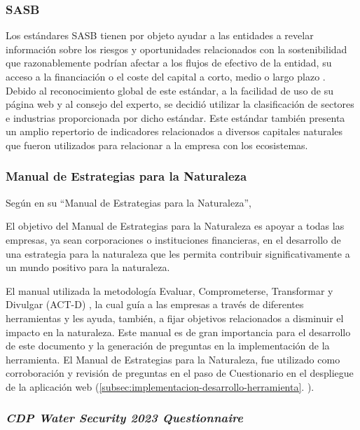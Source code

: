 \subsubsection{SASB}
Los estándares SASB tienen por objeto ayudar a las entidades a revelar información sobre los riesgos y oportunidades relacionados con la sostenibilidad que razonablemente podrían afectar a los flujos de efectivo de la entidad, su acceso a la financiación o el coste del capital a corto, medio o largo plazo \parencite{sasb-standards-2023}. Debido al reconocimiento global de este estándar, a la facilidad de uso de su página web y al consejo del experto, se decidió utilizar la clasificación de sectores e industrias proporcionada por dicho estándar. Este estándar también presenta un amplio repertorio de indicadores relacionados a diversos capitales naturales que fueron utilizados para relacionar a la empresa con los ecosistemas.  


\subsubsection{Manual de Estrategias para la Naturaleza}
Según \textcite{its-now-for-nature-2023} en su  “Manual de Estrategias para la Naturaleza”,

\hfill
\par
\leftskip=0.35in \rightskip=0.35in
El objetivo del Manual de Estrategias para la Naturaleza es apoyar a todas las empresas, ya sean corporaciones o instituciones financieras, en el desarrollo de una estrategia para la naturaleza que les permita contribuir significativamente a un mundo positivo para la naturaleza.

\hfill
\par
\leftskip=0in \rightskip=0in
El manual utilizada la metodología Evaluar, Comprometerse, Transformar y Divulgar (ACT-D) \parencite{its-now-for-nature-2023}, la cual guía a las empresas a través de diferentes herramientas y les ayuda, también, a fijar objetivos relacionados a disminuir el impacto en la naturaleza. Este manual es de gran importancia para el desarrollo de este documento y la generación de preguntas en la implementación de la herramienta. El Manual de Estrategias para la Naturaleza, fue utilizado como corroboración y revisión de preguntas en el paso de Cuestionario en el despliegue de la aplicación web (\ref{subsec:implementacion-desarrollo-herramienta}. ). 


\subsubsection{\textit{CDP Water Security 2023 Questionnaire}}


